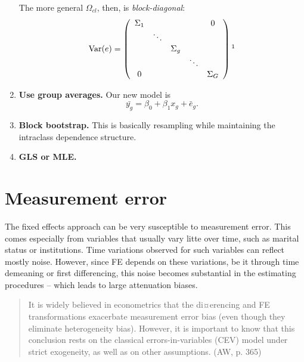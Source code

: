 \documentclass[11pt, a4paper]{report}
\theoremstyle{plain}
\theoremstyle{plain}
\theoremstyle{remark}
\begin{document}
\begin{enumerate}
    The more general ${\Omega}_{c l}$, then, is \textit{block-diagonal}:
    \begin{equation}
        \operatorname{Var}(e)=\left(\begin{array}{ccccc}
        \Sigma_{1} & & & & 0 \\
        & \ddots & & & \\
        & & \Sigma_{g} & & \\
        & & & \ddots & \\
        0 & & & & \Sigma_{G}
        \end{array}\right)\footnote{\href{http://fmwww.bc.edu/repec/usug2007/crse04.pdf}{http://fmwww.bc.edu/repec/usug2007/crse04.pdf}}
        \end{equation}
    \item \textbf{Use group averages.} Our new model is 
    \begin{equation}
        \bar{y_g} = \beta_0 + \beta_1 x_g + \bar{e}_g.
    \end{equation}
    \item \textbf{Block bootstrap.} This is basically resampling while maintaining the intraclass dependence structure.
    \item \textbf{GLS or MLE.}
\end{enumerate}


















\section{Measurement error}

The fixed effects approach can be very susceptible to measurement error. This comes especially from variables that usually vary litte over time, such as marital status or institutions. Time variations observed for such variables can reflect mostly noise. However, since FE depends on these variations, be it through time demeaning or first differencing, this noise becomes substantial in the estimating procedures -- which leads to large attenuation biases.

\begin{quote}
    It is widely believed in econometrics that the
    di¤erencing and FE transformations exacerbate measurement error bias (even though
    they eliminate heterogeneity bias). However, it is important to know that this conclusion rests on the classical errors-in-variables (CEV) model under strict exogeneity,
    as well as on other assumptions. (AW, p. 365)
\end{quote}
\end{document}
